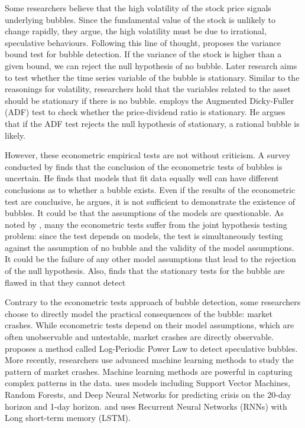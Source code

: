 \documentclass[12pt, man, a4paper, floatsintext]{apa7}
\begin{document}
Some researchers believe that the high volatility of the stock price signals underlying bubbles. Since the fundamental value of the stock is unlikely to change rapidly, they argue, the high volatility must be due to irrational, speculative behaviours. Following this line of thought, \textcite{shiller1980} proposes the variance bound test for bubble detection. If the variance of the stock is higher than a given bound, we can reject the null hypothesis of no bubble. Later research aims to test whether the time series variable of the bubble is stationary. Similar to the reasonings for volatility, researchers hold that the variables related to the asset should be stationary if there is no bubble. \textcite{craine1993} employs the Augmented Dicky-Fuller (ADF) test to check whether the price-dividend ratio is stationary. He argues that if the ADF test rejects the null hypothesis of stationary, a rational bubble is likely.

However, these econometric empirical tests are not without criticism. A survey conducted by \textcite{Gur2008} finds that the conclusion of the econometric tests of bubbles is uncertain. He finds that models that fit data equally well can have different conclusions as to whether a bubble exists. Even if the results of the econometric test are conclusive, he argues, it is not sufficient to demonstrate the existence of bubbles. It could be that the assumptions of the models are questionable. As noted by \textcite{Wckl2019Survey}, many the econometric tests suffer from the joint hypothesis testing problem: since the test depends on models, the test is simultaneously testing against the assumption of no bubble and the validity of the model assumptions. It could be the failure of any other model assumptions that lead to the rejection of the null hypothesis. Also, \textcite{evans1991} finds that the stationary tests for the bubble are flawed in that they cannot detect 

Contrary to the econometric tests approach of bubble detection, some researchers choose to directly model the practical consequences of the bubble: market crashes. While econometric tests depend on their model assumptions, which are often unobservable and untestable, market crashes are directly observable. \textcite{jacobsson2009} proposes a method called Log-Periodic Power Law to detect speculative bubbles. More recently, researchers use advanced machine learning methods to study the pattern of market crashes. Machine learning methods are powerful in capturing complex patterns in the data. \textcite{Chat2018} uses models including Support Vector Machines, Random Forests, and Deep Neural Networks for predicting crisis on the 20-day horizon and 1-day horizon. \textcite{Bash2020} and \textcite{Moser} uses Recurrent Neural Networks (RNNs) with Long short-term memory (LSTM).
\end{document}
